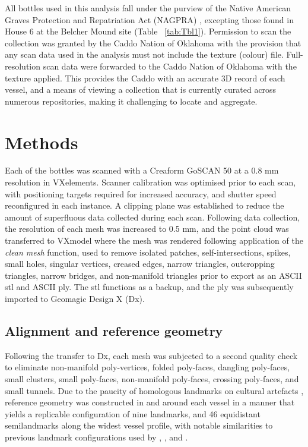 \documentclass[review]{elsarticle}
\begin{document}
All bottles used in this analysis fall under the purview of the Native American Graves Protection and Repatriation Act (NAGPRA) \citep{RN11778x}, excepting those found in House 6 at the Belcher Mound site (Table ~\ref{tab:Tbl1}). Permission to scan the collection was granted by the Caddo Nation of Oklahoma with the provision that any scan data used in the analysis must not include the texture (colour) file. Full-resolution scan data were forwarded to the Caddo Nation of Oklahoma with the texture applied. This provides the Caddo with an accurate 3D record of each vessel, and a means of viewing a collection that is currently curated across numerous repositories, making it challenging to locate and aggregate.

\section{Methods}

Each of the bottles was scanned with a Creaform GoSCAN 50 at a 0.8 mm resolution in VXelements. Scanner calibration was optimised prior to each scan, with positioning targets required for increased accuracy, and shutter speed reconfigured in each instance. A clipping plane was established to reduce the amount of superfluous data collected during each scan. Following data collection, the resolution of each mesh was increased to 0.5 mm, and the point cloud was transferred to VXmodel where the mesh was rendered following application of the \textit{clean mesh} function, used to remove isolated patches, self-intersections, spikes, small holes, singular vertices, creased edges, narrow triangles, outcropping triangles, narrow bridges, and non-manifold triangles prior to export as an ASCII stl and ASCII ply. The stl functions as a backup, and the ply was subsequently imported to Geomagic Design X (Dx).

\subsection{Alignment and reference geometry}

Following the transfer to Dx, each mesh was subjected to a second quality check to eliminate non-manifold poly-vertices, folded poly-faces, dangling poly-faces, small clusters, small poly-faces, non-manifold poly-faces, crossing poly-faces, and small tunnels. Due to the paucity of homologous landmarks on cultural artefacts \citep{RN1730}, reference geometry was constructed in and around each vessel in a manner that yields a replicable configuration of nine landmarks, and 46 equidistant semilandmarks along the widest vessel profile, with notable similarities to previous landmark configurations used by \citet[Figure 4]{RN1752}, \citet[Figure 5]{RN1994}, and \citet[Figure 4]{RN11631}. 
\end{document}
